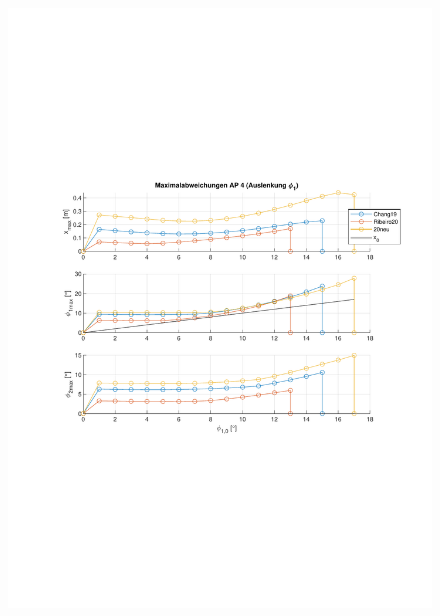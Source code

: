 \begin{figure}
\begin{minipage}[t]{0.45\linewidth}
		\includegraphics[scale=0.5]{Bilder/Parameter neu (Ribeiro) Creg off/AP41.pdf}
		\label{fig:ap3}
	 \end{minipage}
	\hfill
	\begin{minipage}[t]{0.45\linewidth}
		\centering

\end{minipage}
\end{figure}
